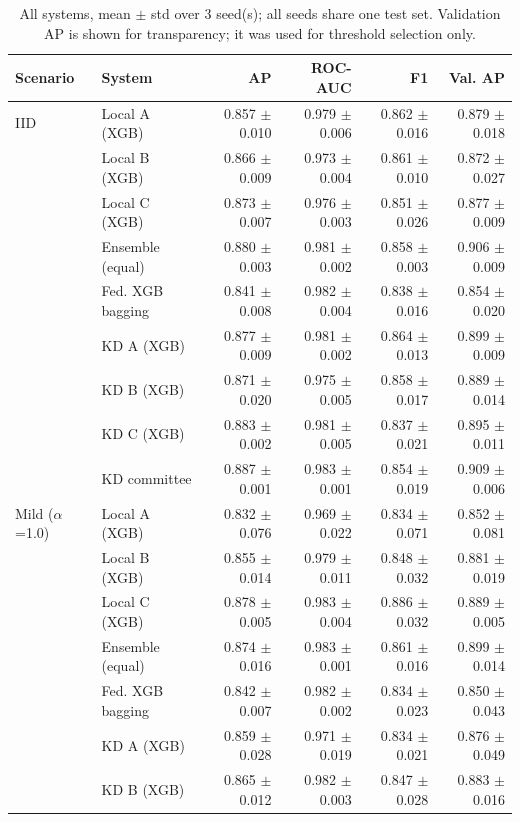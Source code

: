 \begin{table}[t]
\centering
\scriptsize
\caption{All systems, mean $\pm$ std over 3 seed(s); all seeds share one test set. Validation AP is shown for transparency; it was used for threshold selection only.}
\label{tab:seeds}
\begin{tabular}{llrrrr}
\toprule
Scenario & System & AP & ROC-AUC & F1 & Val. AP \\
\midrule
IID & Local A (XGB) & 0.857 $\pm$ 0.010 & 0.979 $\pm$ 0.006 & 0.862 $\pm$ 0.016 & 0.879 $\pm$ 0.018 \\
 & Local B (XGB) & 0.866 $\pm$ 0.009 & 0.973 $\pm$ 0.004 & 0.861 $\pm$ 0.010 & 0.872 $\pm$ 0.027 \\
 & Local C (XGB) & 0.873 $\pm$ 0.007 & 0.976 $\pm$ 0.003 & 0.851 $\pm$ 0.026 & 0.877 $\pm$ 0.009 \\
 & Ensemble (equal) & 0.880 $\pm$ 0.003 & 0.981 $\pm$ 0.002 & 0.858 $\pm$ 0.003 & 0.906 $\pm$ 0.009 \\
 & Fed. XGB bagging & 0.841 $\pm$ 0.008 & 0.982 $\pm$ 0.004 & 0.838 $\pm$ 0.016 & 0.854 $\pm$ 0.020 \\
 & KD A (XGB) & 0.877 $\pm$ 0.009 & 0.981 $\pm$ 0.002 & 0.864 $\pm$ 0.013 & 0.899 $\pm$ 0.009 \\
 & KD B (XGB) & 0.871 $\pm$ 0.020 & 0.975 $\pm$ 0.005 & 0.858 $\pm$ 0.017 & 0.889 $\pm$ 0.014 \\
 & KD C (XGB) & 0.883 $\pm$ 0.002 & 0.981 $\pm$ 0.005 & 0.837 $\pm$ 0.021 & 0.895 $\pm$ 0.011 \\
 & KD committee & 0.887 $\pm$ 0.001 & 0.983 $\pm$ 0.001 & 0.854 $\pm$ 0.019 & 0.909 $\pm$ 0.006 \\
\midrule
Mild ($\alpha$=1.0) & Local A (XGB) & 0.832 $\pm$ 0.076 & 0.969 $\pm$ 0.022 & 0.834 $\pm$ 0.071 & 0.852 $\pm$ 0.081 \\
 & Local B (XGB) & 0.855 $\pm$ 0.014 & 0.979 $\pm$ 0.011 & 0.848 $\pm$ 0.032 & 0.881 $\pm$ 0.019 \\
 & Local C (XGB) & 0.878 $\pm$ 0.005 & 0.983 $\pm$ 0.004 & 0.886 $\pm$ 0.032 & 0.889 $\pm$ 0.005 \\
 & Ensemble (equal) & 0.874 $\pm$ 0.016 & 0.983 $\pm$ 0.001 & 0.861 $\pm$ 0.016 & 0.899 $\pm$ 0.014 \\
 & Fed. XGB bagging & 0.842 $\pm$ 0.007 & 0.982 $\pm$ 0.002 & 0.834 $\pm$ 0.023 & 0.850 $\pm$ 0.043 \\
 & KD A (XGB) & 0.859 $\pm$ 0.028 & 0.971 $\pm$ 0.019 & 0.834 $\pm$ 0.021 & 0.876 $\pm$ 0.049 \\
 & KD B (XGB) & 0.865 $\pm$ 0.012 & 0.982 $\pm$ 0.003 & 0.847 $\pm$ 0.028 & 0.883 $\pm$ 0.016 \\

\end{tabular}
\end{table}
